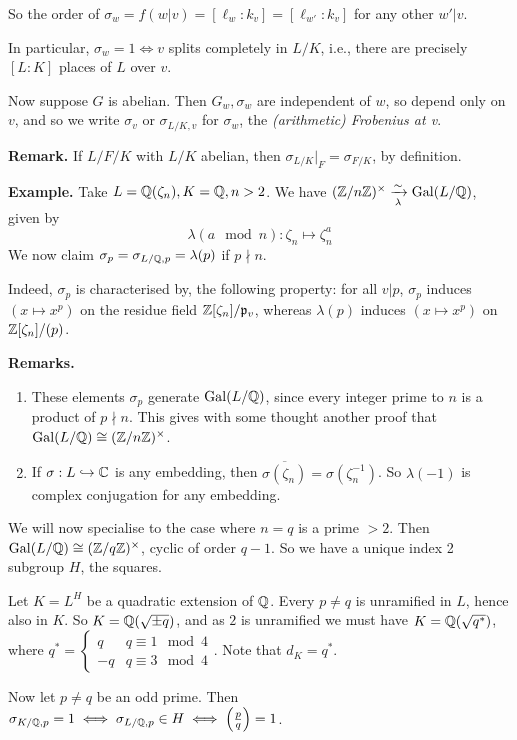 \documentclass[10pt,a4paper]{article}
\begin{document}
So the order of $\sigma_w = f(w|v) = [\ell_w:k_v] = [\ell_{w'}:k_v]$ for any other $w'|v$.

In particular, $\sigma_w = 1 \iff v$ splits completely in $L/K$, i.e., there are precisely $[L:K]$ places of $L$ over $v$.

Now suppose $G$ is abelian. Then $G_w, \sigma_w$ are independent of $w$, so depend only on $v$, and so we write $\sigma_v$ or $\sigma_{L/K,v}$ for $\sigma_w$, the \emph{(arithmetic) Frobenius at v}.

\textbf{Remark.} If $L/F/K$ with $L/K$ abelian, then $\sigma_{L/K}|_{F} = \sigma_{F/K}$, by definition.

\textbf{Example.} Take $L = \mathbb{Q}(\zeta_n), K= \mathbb{Q}, n > 2$. We have $(\mathbb{Z}/n\mathbb{Z})^\times \xrightarrow[\lambda]{\sim} \operatorname{Gal}(L/\mathbb{Q})$, given by
\[\lambda(a \mod n):\zeta_n \mapsto \zeta_n^a\]
We now claim $\sigma_p = \sigma_{L/\mathbb{Q}, p} = \lambda(p)$ if $p \nmid n$.

Indeed, $\sigma_p$ is characterised by, the following property: for all $v|p$, $\sigma_p$ induces $(x\mapsto x^p)$ on the residue field $\mathbb{Z}[\zeta_n]/\mathfrak{p}_v$, whereas $\lambda(p)$ induces $(x\mapsto x^p)$ on $\mathbb{Z}[\zeta_n]/(p)$.

\textbf{Remarks.}
\begin{enumerate}
  \item These elements $\sigma_p$ generate $\operatorname{Gal}(L/\mathbb{Q})$, since every integer prime to $n$ is a product of $p\nmid n$. This gives with some thought another proof that $\operatorname{Gal}(L/\mathbb{Q})\cong (\mathbb{Z}/n\mathbb{Z})^\times$.
  \item If $\sigma: L \hookrightarrow \mathbb{C}$ is any embedding, then $\overline{\sigma(\zeta_n)} = \sigma(\zeta_n^{-1})$. So $\lambda(-1)$ is complex conjugation for any embedding.
\end{enumerate}
We will now specialise to the case where $n=q$ is a prime $>2$. Then $\operatorname{Gal}(L/\mathbb{Q}) \cong (\mathbb{Z}/q\mathbb{Z})^\times$, cyclic of order $q-1$. So we have a unique index 2 subgroup $H$, the squares.

Let $K = L^H$ be a quadratic extension of $\mathbb{Q}$. Every $p \neq q$ is unramified in $L$, hence also in $K$. So $K = \mathbb{Q}(\sqrt{\pm q})$, and as $2$ is unramified we must have $K = \mathbb{Q}(\sqrt{q^\ast})$, where $q^{\ast} = \begin{cases} q & q \equiv 1 \mod 4\\ -q& q \equiv 3 \mod 4 \end{cases}$. Note that $d_K = q^\ast$.

Now let $p \neq q$ be an odd prime. Then $\sigma_{K/\mathbb{Q}, p} = 1 \iff \sigma_{L/\mathbb{Q}, p} \in H \iff \left(\frac{p}{q}\right) = 1$.
\end{document}
